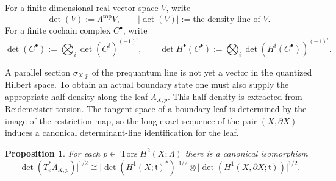 \documentclass[12pt]{amsart}
\numberwithin{equation}{section}
\newtheorem{prop}[theorem]{Proposition}
\DeclareMathOperator{\Det}{det}
\begin{document}
 For a finite-dimensional real vector space $V$, write
\[
\Det(V):=\Lambda^{\mathrm{top}}V,
\qquad
|\Det(V)|:=\text{the density line of }V.
\]
For a finite cochain complex $C^\bullet$, write
\[
\Det(C^\bullet):=\bigotimes_i \Det(C^i)^{(-1)^i},
\qquad
\Det H^\bullet(C^\bullet):=\bigotimes_i \Det(H^i(C^\bullet))^{(-1)^i}.
\]

A parallel section \(\sigma_{X,p}\) of the prequantum line is not yet a vector in the quantized Hilbert space. To obtain an actual boundary state one must also supply the appropriate half-density along the leaf \(\Lambda_{X,p}\). This
half-density is extracted from Reidemeister torsion.
The tangent space of a boundary leaf is determined by the image of the restriction map, so the long exact
sequence of the pair $(X,\partial X)$ induces a canonical determinant-line identification for the leaf.

\begin{prop}
\label{prop:toral-determinant-line}
For each $p \in \operatorname{Tors} H^2(X;\Lambda)$ there is a canonical isomorphism
\[
\bigl|\det(T_e^* \Lambda_{X,p})\bigr|^{1/2}
\cong
\bigl|\det(H^1(X;\mathfrak t)^*)\bigr|^{1/2}
\otimes
\bigl|\det(H^1(X,\partial X;\mathfrak t))\bigr|^{1/2}.
\]
\end{prop}
\end{document}
